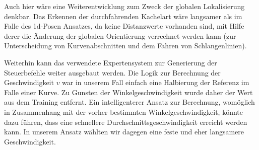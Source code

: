 Auch hier wäre eine Weiterentwicklung zum Zweck der globalen Lokalisierung denkbar. Das Erkennen der durchfahrenden Kachelart wäre langsamer als im Falle des \acs{1d}-Posen Ansatzes, da keine Distanzwerte vorhanden sind, mit Hilfe derer die Änderung der globalen Orientierung verrechnet werden kann (zur Unterscheidung von Kurvenabschnitten und dem Fahren von Schlangenlinien).

Weiterhin kann das verwendete Expertensystem zur Generierung der Steuerbefehle weiter ausgebaut werden. Die Logik zur Berechnung der Geschwindigkeit $v$ war in unserem Fall einfach eine Halbierung der Referenz im Falle einer Kurve. Zu Gunsten der Winkelgeschwindigkeit wurde daher der Wert aus dem Training entfernt. Ein intelligenterer Ansatz zur Berechnung, womöglich in Zusammenhang mit der vorher bestimmten Winkelgeschwindigkeit, könnte dazu führen, dass eine schnellere Durchschnittsgeschwindigkeit erreicht werden kann. In unserem Ansatz wählten wir dagegen eine feste und eher langsamere Geschwindigkeit.
